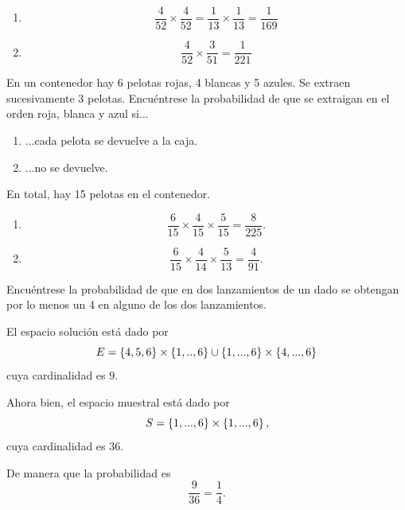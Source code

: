 \begin{solucion}
	\label{solucion:2.3}
	\begin{enumerate}
		\item \[ \dfrac{4}{52}\times\dfrac{4}{52} = \dfrac{1}{13}\times \dfrac{1}{13} = \dfrac{1}{169} \]
		\item \[ \dfrac{4}{52}\times\dfrac{3}{51} = \dfrac{1}{221} \]
	\end{enumerate}
\end{solucion}


\begin{problema}
	\label{problema:2.4}
	En un contenedor hay 6 pelotas rojas, 4 blancas y 5 azules. Se extraen sucesivamente 3 pelotas. Encuéntrese la probabilidad de que se extraigan en el orden roja, blanca y azul si...
	\begin{enumerate}
		\item ...cada pelota se devuelve a la caja.
		\item ...no se devuelve.
	\end{enumerate}
	
\end{problema}

\begin{solucion}
	\label{solucion:2.4}
	En total, hay 15 pelotas en el contenedor.
	\begin{enumerate}
		\item 
		\[
			\dfrac{6}{15}\times\dfrac{4}{15}\times\dfrac{5}{15}
			=\dfrac{8}{225}.
		\]
	\item
	\[
		\dfrac{6}{15}\times\dfrac{4}{14}\times\dfrac{5}{13}
		=\dfrac{4}{91}.
	\]
	\end{enumerate}
\end{solucion}


\begin{problema}
	\label{problema:2.5}
	Encuéntrese la probabilidad de que en dos lanzamientos de un dado se obtengan por lo menos un 4 en alguno de los dos lanzamientos.
\end{problema}

\begin{solucion}
	\label{solucion:2.5}
	El espacio solución está dado por 
	\[
		E = \left\{ 4,5,6 \right\}\times \left\{ 1,..,6 \right\} \cup \left\{ 1,...,6 \right\}\times\left\{ 4,...,6 \right\}
	\]
cuya cardinalidad es $ 9 $. 

Ahora bien, el espacio muestral está dado por
\[
	S = \left\{ 1,...,6 \right\}\times\left\{ 1,...,6 \right\},
\]
cuya cardinalidad es $ 36 $.

De manera que la probabilidad es 
\[
	\dfrac{9}{36}=\dfrac{1}{4}.
\]

\end{solucion}

